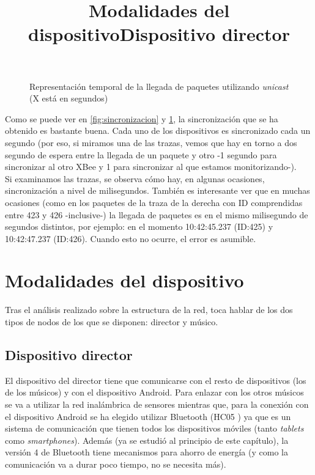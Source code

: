 \begin{figure}[!htb]
{
  }


  \caption{Representación temporal de la llegada de paquetes utilizando \textit{unicast}\\
  (X está en segundos)} \label{fig:graficasincronizados}
  \end{figure}

Como se puede ver en \ref{fig:sincronizacion} y \ref{fig:graficasincronizados},
la sincronización que se ha obtenido es bastante buena. Cada uno de los dispositivos
es sincronizado cada un segundo (por eso, si miramos una de las trazas,
vemos que hay en torno a dos segundo de espera entre la llegada de un paquete y otro
-1 segundo para sincronizar al otro XBee y 1 para sincronizar al que estamos monitorizando-).\\

Si examinamos las trazas, se observa cómo hay, en algunas ocasiones, sincronización
a nivel de milisegundos. También es interesante ver que en muchas ocasiones (como en los
paquetes de la traza de la derecha con ID comprendidas entre 423 y 426 -inclusive-) la
llegada de paquetes es en el mismo milisegundo de segundos distintos, por ejemplo: en el
momento 10:42:45.237 (ID:425) y 10:42:47.237 (ID:426). Cuando esto no ocurre, el error es asumible.\\



\section{Modalidades del dispositivo}
\title{Modalidades del dispositivo}

Tras el análisis realizado sobre la estructura de la red, toca hablar de los dos tipos
de nodos de los que se disponen: director y músico.

\subsection{Dispositivo director}
\title{Dispositivo director}

El dispositivo del director tiene que comunicarse con el resto de dispositivos (los
de los músicos) y con el dispositivo Android. Para enlazar con los otros músicos
se va a utilizar la red inalámbrica de sensores mientras que, para la conexión
con el dispositivo Android se ha elegido utilizar Bluetooth (HC05 \cite{bthc05}) ya que es un sistema
de comunicación que tienen todos los dispositivos móviles (tanto \textit{tablets} como
\textit{smartphones}). Además (ya se estudió al principio de este capítulo), la versión
4 de Bluetooth tiene mecanismos para ahorro de energía (y como la comunicación va a durar
poco tiempo, no se necesita más).\\


